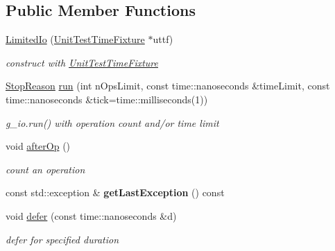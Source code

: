 \subsection*{Public Member Functions}
\begin{DoxyCompactItemize}
\item 
\hyperlink{classnfd_1_1tests_1_1LimitedIo_ac6439ea56d2e60cf4264f90728ee4b19}{Limited\+Io} (\hyperlink{classnfd_1_1tests_1_1UnitTestTimeFixture}{Unit\+Test\+Time\+Fixture} $\ast$uttf)\hypertarget{classnfd_1_1tests_1_1LimitedIo_ac6439ea56d2e60cf4264f90728ee4b19}{}\label{classnfd_1_1tests_1_1LimitedIo_ac6439ea56d2e60cf4264f90728ee4b19}

\begin{DoxyCompactList}\small\item\em construct with \hyperlink{classnfd_1_1tests_1_1UnitTestTimeFixture}{Unit\+Test\+Time\+Fixture} \end{DoxyCompactList}\item 
\hyperlink{classnfd_1_1tests_1_1LimitedIo_adbe63f8389fb55a9267d5291c48319c3}{Stop\+Reason} \hyperlink{classnfd_1_1tests_1_1LimitedIo_a141fc07273128fab881105214beb7e92}{run} (int n\+Ops\+Limit, const time\+::nanoseconds \&time\+Limit, const time\+::nanoseconds \&tick=time\+::milliseconds(1))
\begin{DoxyCompactList}\small\item\em g\+\_\+io.\+run() with operation count and/or time limit \end{DoxyCompactList}\item 
void \hyperlink{classnfd_1_1tests_1_1LimitedIo_ad5920fbb88db8b67f1e0c5444bbb7c95}{after\+Op} ()\hypertarget{classnfd_1_1tests_1_1LimitedIo_ad5920fbb88db8b67f1e0c5444bbb7c95}{}\label{classnfd_1_1tests_1_1LimitedIo_ad5920fbb88db8b67f1e0c5444bbb7c95}

\begin{DoxyCompactList}\small\item\em count an operation \end{DoxyCompactList}\item 
const std\+::exception \& {\bfseries get\+Last\+Exception} () const\hypertarget{classnfd_1_1tests_1_1LimitedIo_abfca3fc6d244fefa4782339ff5004164}{}\label{classnfd_1_1tests_1_1LimitedIo_abfca3fc6d244fefa4782339ff5004164}

\item 
void \hyperlink{classnfd_1_1tests_1_1LimitedIo_aee68ffc90812a46771df78271b349921}{defer} (const time\+::nanoseconds \&d)
\begin{DoxyCompactList}\small\item\em defer for specified duration \end{DoxyCompactList}\end{DoxyCompactItemize}
